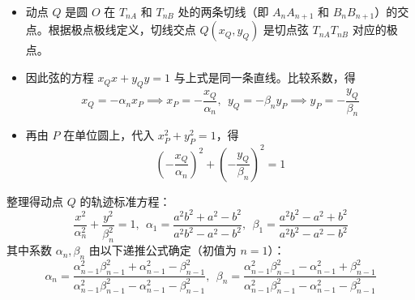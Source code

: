 \begin{solution}
\begin{itemize}
$$\alpha_n x_P x + \beta_n y_P y = -1 \implies (-\alpha_n x_P) x + (-\beta_n y_P) y = 1$$
\item 动点 $Q$ 是圆 $O$ 在 $T_{nA}$ 和 $T_{nB}$ 处的两条切线（即 $A_n A_{n+1}$ 和 $B_n B_{n+1}$）的交点。根据极点极线定义，切线交点 $Q(x_Q, y_Q)$ 是切点弦 $T_{nA}T_{nB}$ 对应的极点。
\item 因此弦的方程 $x_Q x + y_Q y = 1$ 与上式是同一条直线。比较系数，得
$$x_Q = -\alpha_n x_P \implies x_P = -\frac{x_Q}{\alpha_n},~~y_Q = -\beta_n y_P \implies y_P = -\frac{y_Q}{\beta_n}$$
\item 再由 $P$ 在单位圆上，代入 $x_P^2 + y_P^2 = 1$，得
$$\left(-\frac{x_Q}{\alpha_n}\right)^2 + \left(-\frac{y_Q}{\beta_n}\right)^2 = 1$$
\end{itemize}
整理得动点 $Q$ 的轨迹标准方程：
$${\frac{x^2}{\alpha_n^2} + \frac{y^2}{\beta_n^2} = 1},~~\alpha_1 = \frac{a^2 b^2 + a^2 - b^2}{a^2 b^2 - a^2 - b^2}, ~~\beta_1 = \frac{a^2 b^2 - a^2 + b^2}{a^2 b^2 - a^2 - b^2}$$
其中系数 $\alpha_n, \beta_n$ 由以下递推公式确定（初值为 $n=1$）：
$$\alpha_{n} = \frac{\alpha_{n-1}^2 \beta_{n-1}^2 + \alpha_{n-1}^2 - \beta_{n-1}^2}{\alpha_{n-1}^2 \beta_{n-1}^2 - \alpha_{n-1}^2 - \beta_{n-1}^2},~~ \beta_{n} = \frac{\alpha_{n-1}^2 \beta_{n-1}^2 - \alpha_{n-1}^2 + \beta_{n-1}^2}{\alpha_{n-1}^2 \beta_{n-1}^2 - \alpha_{n-1}^2 - \beta_{n-1}^2}$$
\end{solution}

